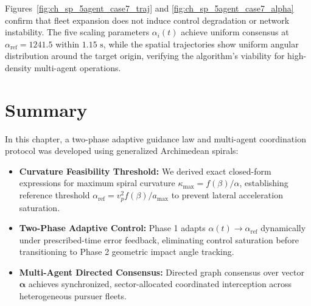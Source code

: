 Figures~\ref{fig:ch_sp_5agent_case7_traj} and \ref{fig:ch_sp_5agent_case7_alpha} confirm that fleet expansion does not induce control degradation or network instability. The five scaling parameters $\alpha_i(t)$ achieve uniform consensus at $\alpha_{\text{ref}} = 1241.5$ within $1.15\text{ s}$, while the spatial trajectories show uniform angular distribution around the target origin, verifying the algorithm's viability for high-density multi-agent operations.
\section{Summary}\label{sec:ch_sp_summary}

In this chapter, a two-phase adaptive guidance law and multi-agent coordination protocol was developed using generalized Archimedean spirals:
\begin{itemize}
	\item \textbf{Curvature Feasibility Threshold:} We derived exact closed-form expressions for maximum spiral curvature $\kappa_{\max} = f(\beta)/\alpha$, establishing reference threshold $\alpha_{\text{ref}} = v_p^2 f(\beta)/a_{\max}$ to prevent lateral acceleration saturation.
	\item \textbf{Two-Phase Adaptive Control:} Phase 1 adapts $\alpha(t) \to \alpha_{\text{ref}}$ dynamically under prescribed-time error feedback, eliminating control saturation before transitioning to Phase 2 geometric impact angle tracking.
	\item \textbf{Multi-Agent Directed Consensus:} Directed graph consensus over vector $\boldsymbol{\alpha}$ achieves synchronized, sector-allocated coordinated interception across heterogeneous pursuer fleets.
\end{itemize}
